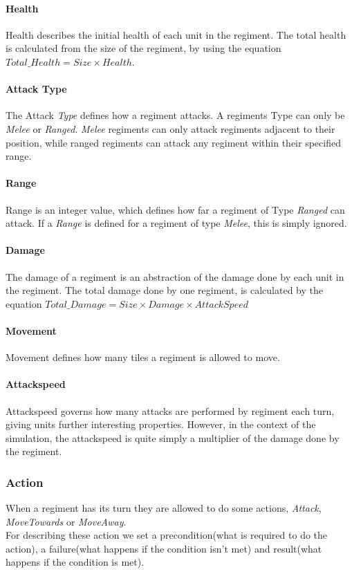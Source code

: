 		\paragraph{Health}
		Health describes the initial health of each unit in the regiment.
		The total health is calculated from the size of the regiment, by using the equation $Total\_Health = Size \times Health$.
		
		\paragraph{Attack Type}
		The Attack \textit{Type} defines how a regiment attacks. A regiments Type can only be \textit{Melee} or \textit{Ranged}.
		\textit{Melee} regiments can only attack regiments adjacent to their position, while ranged regiments 
		can attack any regiment within their specified range.
		
		\paragraph{Range}
		Range is an integer value, which defines how far a regiment of Type \textit{Ranged} can attack. 
		If a \textit{Range} is defined for a regiment of type \textit{Melee}, this is simply ignored.
		
		\paragraph{Damage}
		The damage of a regiment is an abstraction of the damage done by each unit in the regiment.
		The total damage done by one regiment, is calculated by the equation $Total\_Damage = Size \times Damage \times AttackSpeed$ 
		
		\paragraph{Movement}
		Movement defines how many tiles a regiment is allowed to move.
		
		\paragraph{Attackspeed}
		Attackspeed governs how many attacks are performed by regiment each turn, giving units further interesting properties. 
		However, in the context of the simulation, the attackspeed is quite simply a multiplier of the damage done by the regiment.
		
		\subsubsection{Action}
		When a regiment has its turn they are allowed to do some actions, \textit{Attack}, \textit{MoveTowards} or \textit{MoveAway}. \\
		For describing these action we set a precondition(what is required to do the action), a failure(what happens if the condition isn't met)
		and result(what happens if the condition is met).
		
